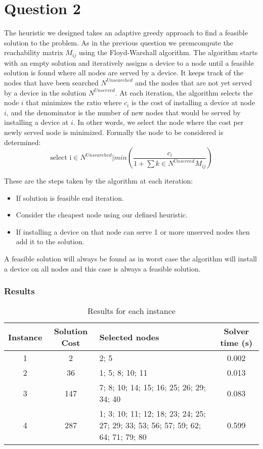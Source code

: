 \section{Question 2}

The heuristic we designed takes an adaptive greedy approach to find a feasible solution to the problem.
As in the previous question we premcompute the reachability matrix $M_{ij}$ using the Floyd-Warshall algorithm.
The algorithm starts with an empty solution and iteratively assigns a device to a node until a feasible solution is found where all nodes are served by a device.
It keeps track of the nodes that have been searched $N^{Unsearched}$ and the nodes that are not yet served by a device in the solution $N^{Unserved}$.
At each iteration, the algorithm selects the node $i$ that minimizes the ratio
where $c_i$ is the cost of installing a device at node $i$, and the denominator is the number of new nodes that would be served by installing a device at $i$. In other words, we select the node where the cost per newly served node is minimized.
Formally the node to be considered is determined: 
$$\text{select i} \in N^{Unsearched} | min(\frac{c_i}{1 + \sum{k \in N^{Unserved}}^{} M_{ij}})$$

These are the steps taken by the algorithm at each iteration:
\begin{itemize}
	\item If solution is feasible end iteration.
	\item Consider the cheapest node using our defined heuristic.
	\item If installing a device on that node can serve 1 or more unserved nodes then add it to the solution.
\end{itemize}

A feasible solution will always be found as in worst case the algorithm will install a device on all nodes and this case is always a feasible solution.

\subsubsection*{Results}

\begin{table}[h!]
	\centering
	\begin{tabularx}{\textwidth}{|c|c|X|c|}
		\hline
		\textbf{Instance} & \textbf{Solution Cost} & \textbf{Selected nodes} & \textbf{Solver time (s)} \\
		\hline
		1 & 2 & 2; 5 & 0.002 \\
		\hline
		2 & 36 & 1; 5; 8; 10; 11 & 0.013 \\
		\hline
		3 & 147 & 7; 8; 10; 14; 15; 16; 25; 26; 29; 34; 40 & 0.083 \\
		\hline
		4 & 287 & 1; 3; 10; 11; 12; 18; 23; 24; 25; 27; 29; 33; 53; 56; 57; 59; 62; 64; 71; 79; 80 & 0.599 \\
		\hline
	\end{tabularx}
	\caption{Results for each instance}
	\label{tab:instance_costs}
\end{table}
